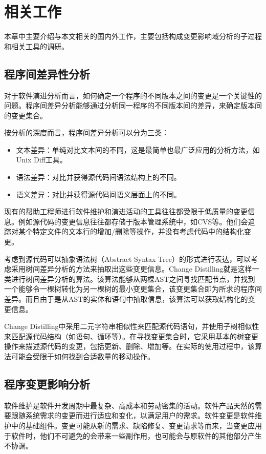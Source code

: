 \chapter{相关工作}

本章中主要介绍与本文相关的国内外工作，主要包括构成变更影响域分析的子过程和相关工具的调研。
\section{程序间差异性分析}

对于软件演进分析而言，如何确定一个程序的不同版本之间的变更是一个关键性的问题\cite{kim2013identifying}。程序间差异分析能够通过分析同一程序的不同版本间的差异，来确定版本间的变更集合\cite{lahiri2010differential,winstead2003towards}。

按分析的深度而言，程序间差异分析可以分为三类：
\begin{itemize}
	\item 文本差异：单纯对比文本间的不同，这是最简单也最广泛应用的分析方法，如Unix Diff工具。
	\item 语法差异：对比并获得源代码间语法结构上的不同。
	\item 语义差异：对比并获得源代码间语义层面上的不同。
\end{itemize}

现有的帮助工程师进行软件维护和演进活动的工具往往都受限于低质量的变更信息。例如源代码的变更信息往往都存储于版本管理系统中，如CVS等。他们会追踪对某个特定文件的文本行的增加/删除等操作，并没有考虑代码中的结构化变更。

考虑到源代码可以抽象语法树（Abstract Syntax Tree）的形式进行表达，可以考虑采用树间差异分析的方法来抽取出这些变更信息。Change Distilling就是这样一类进行树间差异分析的算法\cite{fluri2007change,gall2009change}。该算法能够从两棵AST之间寻找匹配节点，并找到一个能够令一棵树转化为另一棵树的最小变更集合，该变更集合即为所求的程序间差异。而且由于是从AST的实体和语句中抽取信息，该算法可以获取结构化的变更信息。

Change Distilling中采用二元字符串相似性来匹配源代码语句，并使用子树相似性来匹配源代码结构（如语句、循环等）。在寻找变更集合时，它采用基本的树变更操作来描述源代码的变更，包括更新、删除、增加等。在实际的使用过程中，该算法可能会受限于如何找到合适数量的移动操作。

\section{程序变更影响分析}
软件维护是软件开发周期中最复杂、高成本和劳动密集的活动。软件产品天然的需要跟随系统需求的变更而进行适应和变化，以满足用户的需求。软件变更是软件维护中的基础组件。变更可能从新的需求、缺陷修复、变更请求等而来，当变更应用于软件时，他们不可避免的会带来一些副作用，也可能会与原软件的其他部分产生不协调。

